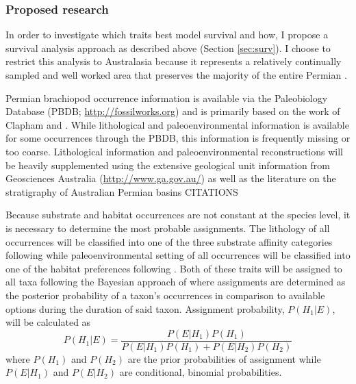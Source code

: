 \documentclass[12pt,letterpaper]{article}
\begin{document}
\subsubsection{Proposed research} \label{sec:bracsurvmeth}

In order to investigate which traits best model survival and how, I propose a survival analysis approach as described above (Section \ref{sec:surv}). I choose to restrict this analysis to Australasia because it represents a relatively continually sampled and well worked area that preserves the majority of the entire Permian \citep{Fielding2008,Birgenheier2010,Clapham2012,Clapham2008a,Waterhouse1987,Archbold1995}.

Permian brachiopod occurrence information is available via the Paleobiology Database (PBDB; \url{http://fossilworks.org}) and is primarily based on the work of Clapham \citep{Clapham2006,Clapham2008a,Clapham2007a,Clapham2012,Clapham2007} and \citet{Waterhouse1987}. While lithological and paleoenvironmental information is available for some occurrences through the PBDB, this information is frequently missing or too coarse. Lithological information and paleoenvironmental reconstructions will be heavily supplemented using the extensive geological unit information from Geosciences Australia (\url{http://www.ga.gov.au/}) as well as the literature on the stratigraphy of Australian Permian basins CITATIONS


Because substrate and habitat occurrences are not constant at the species level, it is necessary to determine the most probable assignments. The lithology of all occurrences will be classified into one of the three substrate affinity categories following \citet{Foote2006} while paleoenvironmental setting of all occurrences will be classified into one of the habitat preferences following \citet{Kiessling2007}. Both of these traits will be assigned to all taxa following the Bayesian approach of \citet{Simpson2009} where assignments are determined as the posterior probability of a taxon's occurrences in comparison to available options during the duration of said taxon. Assignment probability, \(P(H_{1}|E)\), will be calculated as
\begin{equation}
  P(H_{1}|E) = \frac{P(E|H_{1})P(H_{1})}{P(E|H_{1})P(H_{1}) + P(E|H_{2})P(H_{2})}
  \label{eq:aff}
\end{equation}
where \(P(H_{1})\) and \(P(H_{2})\) are the prior probabilities of assignment while \(P(E|H_{1})\) and \(P(E|H_{2})\) are conditional, binomial probabilities. 
\end{document}
